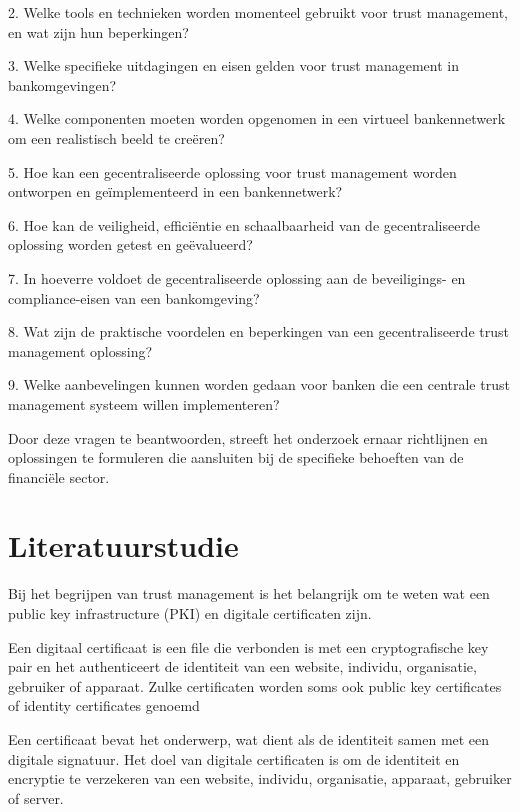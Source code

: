 2. Welke tools en technieken worden momenteel gebruikt voor trust management, en wat zijn hun beperkingen?

3. Welke specifieke uitdagingen en eisen gelden voor trust management in bankomgevingen?

4. Welke componenten moeten worden opgenomen in een virtueel bankennetwerk om een realistisch beeld te creëren?

5. Hoe kan een gecentraliseerde oplossing voor trust management worden ontworpen en geïmplementeerd in een bankennetwerk?

6. Hoe kan de veiligheid, efficiëntie en schaalbaarheid van de gecentraliseerde oplossing worden getest en geëvalueerd?

7. In hoeverre voldoet de gecentraliseerde oplossing aan de beveiligings- en compliance-eisen van een bankomgeving?

8. Wat zijn de praktische voordelen en beperkingen van een gecentraliseerde trust management oplossing?

9. Welke aanbevelingen kunnen worden gedaan voor banken die een centrale trust management systeem willen implementeren?

Door deze vragen te beantwoorden, streeft het onderzoek ernaar richtlijnen en oplossingen te formuleren die aansluiten bij de specifieke behoeften van de financiële sector.


\section{Literatuurstudie}%
\label{sec:literatuurstudie}

Bij het begrijpen van trust management is het belangrijk om te weten wat een public key infrastructure (PKI) en digitale certificaten zijn.

Een digitaal certificaat is een file die verbonden is met een cryptografische key pair en het authenticeert de identiteit van een website, individu, organisatie, gebruiker of apparaat. Zulke certificaten worden soms ook public key certificates of identity certificates genoemd

Een certificaat bevat het onderwerp, wat dient als de identiteit samen met een digitale signatuur. Het doel van digitale certificaten is om de identiteit en encryptie te verzekeren van een website, individu, organisatie, apparaat, gebruiker of server. \autocite{Digicert}

